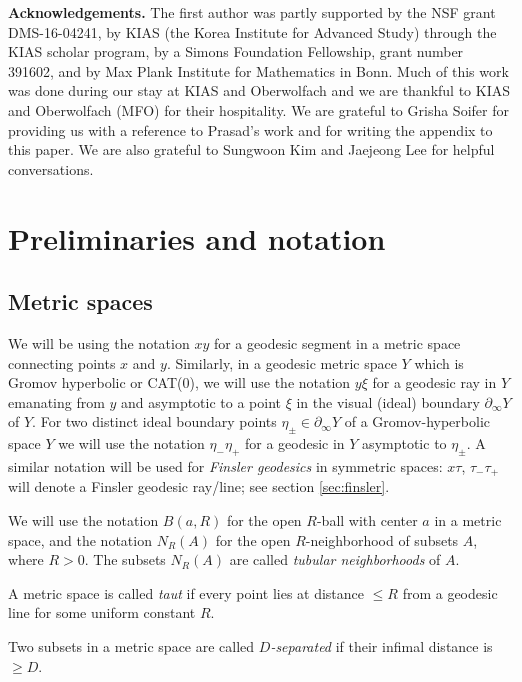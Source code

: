 \documentclass[12pt]{article}
\theoremstyle{boldplain}
\theoremstyle{bolddefinition}
\numberwithin{equation}{section}
\def\geo{\partial_{\infty}}
\begin{document}
\medskip  
{\bf Acknowledgements.} The first author was partly supported by the NSF grant  DMS-16-04241, by 
KIAS (the Korea Institute for Advanced Study) through the KIAS scholar program, by a Simons Foundation Fellowship, grant number 391602, 
and by Max Plank Institute for Mathematics in Bonn. Much of this work was done during our stay at KIAS and Oberwolfach and we are thankful to KIAS and Oberwolfach (MFO) for their  hospitality. We are grateful to Grisha Soifer for providing us with a reference to Prasad's work \cite{Prasad} 
and for writing the appendix to this paper. We are also grateful to Sungwoon Kim   and Jaejeong Lee for helpful conversations. 



\section{Preliminaries and notation}



\subsection{Metric spaces}\label{sec:metric_spaces}


We will be using the notation $xy$ for a geodesic segment in a metric space connecting points $x$ and $y$. 
Similarly, in a geodesic metric space $Y$ which is Gromov hyperbolic or CAT(0),
we will use the notation $y\xi$ for a geodesic ray in $Y$ emanating from $y$ and asymptotic to a point $\xi$
in the visual (ideal) boundary $\geo Y$ of $Y$. For two distinct ideal boundary 
points $\eta_\pm\in \geo Y$ of a Gromov-hyperbolic space $Y$ we will use the notation $\eta_-\eta_+$ for a geodesic in $Y$ asymptotic to $\eta_\pm$.  A similar notation will be used for {\em Finsler geodesics} in symmetric spaces:  
 $x\tau$, $\tau_- \tau_+$ will denote a Finsler geodesic ray/line; see section \ref{sec:finsler}. 

We will use the notation $B(a, R)$ for the open $R$-ball with center $a$ in a metric space,
and the notation $N_R(A)$ for the open $R$-neighborhood of subsets $A$, where $R >0$. 
The subsets $N_R(A)$ are called {\em tubular neighborhoods} of $A$. 



A metric space is called {\em taut} 
if every point lies at distance $\leq R$ from a geodesic line for some uniform constant $R$.

Two subsets in a metric space are called {\em $D$-separated} if their infimal distance is $\geq D$. 
\end{document}
